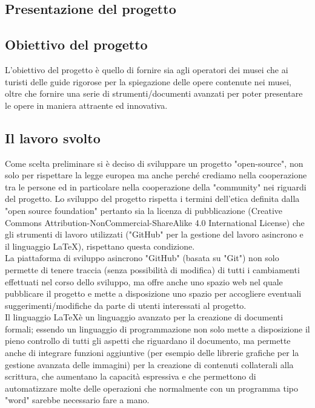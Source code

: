 \documentclass[hidelinks,12pt,a4paper]{article}
\begin{document}
\begin{flushleft}
		\section{Presentazione del progetto}
		\subsection{Obiettivo del progetto}
		L'obiettivo del progetto è quello di fornire sia agli operatori dei musei che ai turisti delle guide rigorose per la spiegazione delle opere contenute nei musei, oltre che fornire una serie di strumenti/documenti avanzati per poter presentare le opere in maniera attraente ed innovativa.
		
		\subsection{Il lavoro svolto}
		Come scelta preliminare si è deciso di sviluppare un progetto "open-source", non solo per rispettare la legge europea ma anche perché crediamo nella cooperazione tra le persone ed in particolare nella cooperazione della "community" nei riguardi del progetto. Lo sviluppo del progetto rispetta i termini dell'etica definita dalla "open source foundation" pertanto sia la licenza di pubblicazione (Creative Commons Attribution-NonCommercial-ShareAlike 4.0 International License) che gli strumenti di lavoro utilizzati ("GitHub" per la gestione del lavoro asincrono e il linguaggio \LaTeX), rispettano questa condizione.\\
		La piattaforma di sviluppo asincrono "GitHub" (basata su "Git") non solo permette di tenere traccia (senza possibilità di modifica) di tutti i cambiamenti effettuati nel corso dello sviluppo, ma offre anche uno spazio web nel quale pubblicare il progetto e mette a disposizione uno spazio per accogliere eventuali suggerimenti/modifiche da parte di utenti interessati al progetto.\\
		Il linguaggio \LaTeX è un linguaggio avanzato per la creazione di documenti formali; essendo un linguaggio di programmazione non solo mette a disposizione il pieno controllo di tutti gli aspetti che riguardano il documento, ma permette anche di integrare funzioni aggiuntive (per esempio delle librerie grafiche per la gestione avanzata delle immagini) per la creazione di contenuti collaterali alla scrittura, che aumentano la capacità espressiva e che permettono di automatizzare molte delle operazioni che normalmente con un programma tipo "word" sarebbe necessario fare a mano.\\

\end{flushleft}
\end{document}

